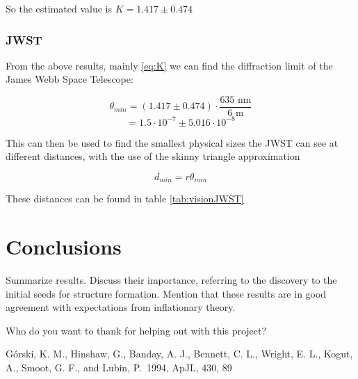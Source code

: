 \documentclass{emulateapj}
\begin{document}
So the estimated value is $K = 1.417 \pm 0.474$

\subsubsection{JWST}
From the above results, mainly \eqref{eq:K} we can find the diffraction limit of the James Webb Space Telescope:

\begin{equation}
\theta_{min} = (1.417 \pm 0.474) \cdot \frac{635 \text{ nm}}{6 \text{ m}}
\end{equation}
\begin{equation}
= 1.5\cdot 10^{-7} \pm 5.016\cdot 10^{-8}
\end{equation}\label{JWSTDiffLimit}

This can then be used to find the smallest physical sizes the JWST can see at different distances, with the use of the skinny triangle approximation

\begin{equation}
d_{min} = r\theta_{min}
\end{equation}

These distances can be found in table \ref{tab:visionJWST}
\section{Conclusions}
\label{sec:conclusions}

Summarize results. Discuss their importance, referring to the
discovery to the initial seeds for structure formation. Mention that
these results are in good agreement with expectations from
inflationary theory.



%
%


%



\begin{acknowledgements}
  Who do you want to thank for helping out with this project?
\end{acknowledgements}

\begin{thebibliography}{}

 G{\'o}rski, K. M.,
  Hinshaw, G., Banday, A. J., Bennett, C. L., Wright, E. L., Kogut,
  A., Smoot, G. F., and Lubin, P.\ 1994, ApJL, 430, 89

\end{thebibliography}
\end{document}
